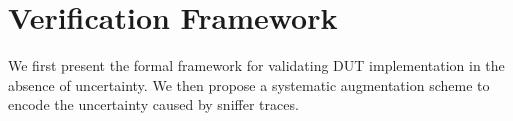 \section{Verification Framework}
\label{sec:framework}

We first present the formal framework for validating DUT implementation in the
absence of uncertainty.
%
We then propose a systematic augmentation scheme to encode the uncertainty
caused by sniffer traces.







